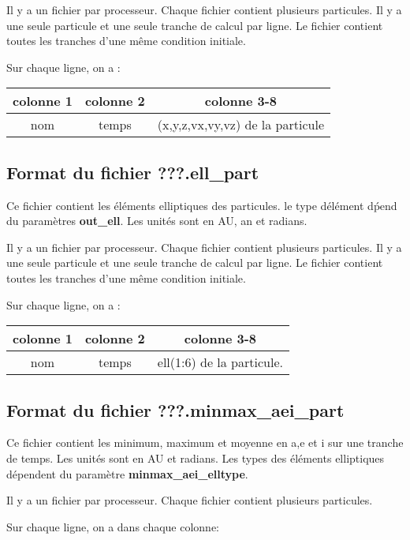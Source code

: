 \documentclass[11pt]{article}
\begin{document}
 Il y a un fichier par processeur. Chaque fichier contient plusieurs particules.  Il y a une seule particule et une seule tranche de calcul  par ligne. Le fichier contient toutes les tranches d'une m\^eme  condition initiale.


Sur chaque ligne, on a : 

\begin{tabular}{|c|c|c|} \hline
colonne 1 &   colonne 2 & colonne 3-8\\ \hline
nom & temps & (x,y,z,vx,vy,vz) de la particule  \\    \hline
\end{tabular}

\subsection{Format du fichier {\bf ???.ell\_part} }

Ce fichier contient les \'el\'ements elliptiques des particules. le type d\'el\'ement d\'pend du param\`etres  {\bf out\_ell}. Les unit\'es sont en AU, an et radians.

 Il y a un fichier par processeur. Chaque fichier contient plusieurs particules.  Il y a une seule particule et une seule tranche de calcul  par ligne. Le fichier contient toutes les tranches d'une m\^eme  condition initiale.

Sur chaque ligne, on a : 

\begin{tabular}{|c|c|c|} \hline
colonne 1 &   colonne 2 & colonne 3-8\\ \hline
nom &  temps & ell(1:6) de la particule. \\    \hline
\end{tabular}

\subsection{Format du fichier {\bf ???.minmax\_aei\_part} }

Ce fichier contient les minimum, maximum et moyenne en a,e et i sur une tranche de temps. Les unit\'es sont en AU et radians.
Les types des \'el\'ements elliptiques d\'ependent du param\`etre  {\bf minmax\_aei\_elltype}.

 Il y a un fichier par processeur. Chaque fichier contient plusieurs particules.
 
 
Sur chaque ligne, on a dans chaque colonne: 
\end{document}
